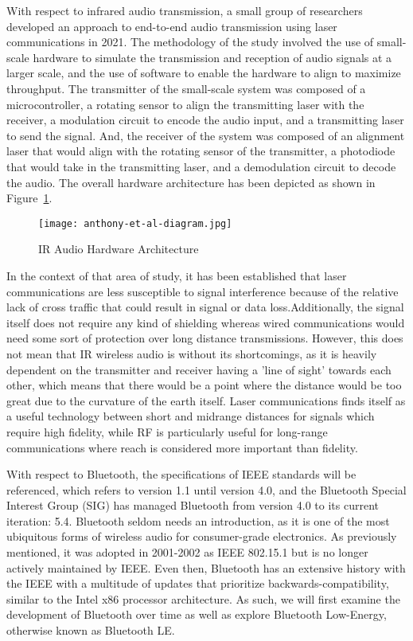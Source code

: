 \documentclass[conference]{IEEEtran}
\begin{document}
With respect to infrared audio transmission, a small group of researchers developed an
approach to end-to-end audio transmission using laser communications in 2021. The methodology
of the study involved the use of small-scale hardware to simulate the transmission and
reception of audio signals at a larger scale, and the use of software to enable the hardware
to align to maximize throughput. The transmitter of the small-scale system was composed of a
microcontroller, a rotating sensor to align the transmitting laser with the receiver, a
modulation circuit to encode the audio input, and a transmitting laser to send the signal.
And, the receiver of the system was composed of an alignment laser that would align with the
rotating sensor of the transmitter, a photodiode that would take in the transmitting laser,
and a demodulation circuit to decode the audio. The overall hardware architecture has been
depicted as shown in Figure~\ref{fig:IR_hardware}.\cite{anthony_approach_2021}

\begin{figure}[htbp]
    \centering
    \texttt{[image: anthony-et-al-diagram.jpg]}
    \caption{IR Audio Hardware Architecture \cite{anthony_approach_2021}}
    \label{fig:IR_hardware}
\end{figure}

In the context of that area of study, it has been established that laser communications are
less susceptible to signal interference because of the relative lack of cross traffic that
could result in signal or data loss.Additionally, the signal itself does not require any kind
of shielding whereas wired communications would need some sort of protection over long
distance transmissions. However, this does not mean that IR wireless audio is without its
shortcomings, as it is heavily dependent on the transmitter and receiver having a 'line of
sight' towards each other, which means that there would be a point where the distance would
be too great due to the curvature of the earth itself. Laser communications finds itself as a
useful technology between short and midrange distances for signals which require high
fidelity, while RF is particularly useful for long-range communications where reach is
considered more important than fidelity.\cite{anthony_approach_2021}

With respect to Bluetooth, the specifications of IEEE standards will be referenced, which
refers to version 1.1 until version 4.0, and the Bluetooth Special Interest Group (SIG) has
managed Bluetooth from version 4.0 to its current iteration: 5.4. Bluetooth seldom needs an
introduction, as it is one of the most ubiquitous forms of wireless audio for consumer-grade
electronics. As previously mentioned, it was adopted in 2001-2002 as IEEE 802.15.1 but is no
longer actively maintained by IEEE.\cite{bhalla_unraveling_2021} Even then, Bluetooth has an
extensive history with the IEEE with a multitude of updates that prioritize
backwards-compatibility, similar to the Intel x86 processor architecture.
\cite{noauthor_bluetooth_nodate} As such, we will first examine the development of Bluetooth
over time as well as explore Bluetooth Low-Energy, otherwise known as Bluetooth LE.
\cite{bhalla_unraveling_2021}
\end{document}
